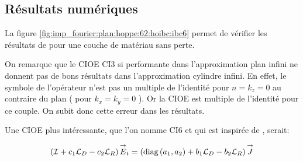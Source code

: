   \subsection{Résultats numériques}

    La figure \ref{fig:imp_fourier:plan:hoppe:62:hoibc:ibc6} permet de vérifier les résultats de \cite[p.~62]{hoppe_impedance_1995} pour une couche de matériau sans perte.


    On remarque que le CIOE CI3 si performante dans l'approximation plan infini ne donnent pas de bons résultats dans l’approximation cylindre infini. 
    En effet, le symbole de l'opérateur n'est pas un multiple de l'identité pour \(n=k_z=0\) au contraire du plan ( pour \(k_x=k_y=0\) ). 
    Or la CIOE est multiple de l'identité pour ce couple. 
    On subit donc cette erreur dans les résultats. 

    Une CIOE plus intéressante, que l'on nomme CI6 et qui est inspirée de \cite[p.~60]{hoppe_impedance_1995}, serait:

    \begin{equation}
      \left({\mathcal{I}} + c_1{\mathcal{L}_D} -c_2{\mathcal{L}_R}\right){\overset{\rightarrow}{E}}_t = \left(\operatorname{diag}\left(a_1,a_2\right) + b_1{\mathcal{L}_D} - b_2 {\mathcal{L}_R} \right){\overset{\rightarrow}{J}}
    \end{equation}

